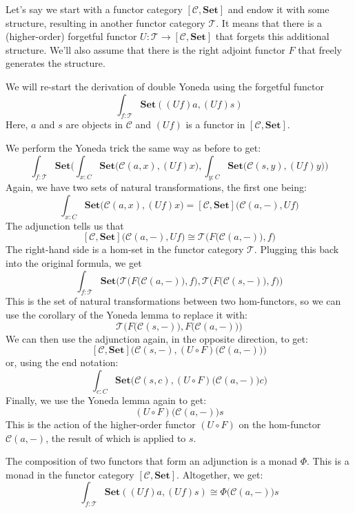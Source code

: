 \documentclass[11pt]{amsart}
\begin{document}
Let's say we start with a functor category $[\mathcal{C}, \mathbf{Set}]$ and endow it with some structure, resulting in another functor category $\mathcal{T}$. It means that there is a (higher-order) forgetful functor $U \colon \mathcal{T} \to [\mathcal{C}, \mathbf{Set}]$ that forgets this additional structure. We'll also assume that there is the right adjoint functor $F$ that freely generates the structure.

We will re-start the derivation of double Yoneda using the forgetful functor
\[ \int_{f \colon \mathcal{T}} \mathbf{Set}( (U f) a, (U f) s)\]
Here, $a$ and $s$ are objects in $\mathcal{C}$ and $(U f)$ is a functor in $[\mathcal{C}, \mathbf{Set}]$.

We perform the Yoneda trick the same way as before to get:
\[  \int_{f \colon \mathcal{T}}  \mathbf{Set}\Big(\int_{x \colon C} \mathbf{Set}\big(\mathcal{C}(a, x),(U f) x), \int_{y \colon C} \mathbf{Set}\big(\mathcal{C}(s, y),(U f) y\big)\Big)\]
Again, we have two sets of natural transformations, the first one being: 
\[\int_{x \colon C} \mathbf{Set}\big(\mathcal{C}(a, x), (U f) x\big) = [\mathcal{C}, \mathbf{Set}]\big(\mathcal{C}(a, -), U f\big)\]
The adjunction tells us that
\[ [\mathcal{C}, \mathbf{Set}]\big(\mathcal{C}(a, -), U f\big) \cong \mathcal{T}\Big(F\big(\mathcal{C}(a, -)\big), f\Big)\]
The right-hand side is a hom-set in the functor category $\mathcal{T}$. Plugging this back into the original formula, we get 
\[  \int_{f \colon \mathcal{T}}  \mathbf{Set}\Big(\mathcal{T}\Big(F\big(\mathcal{C}(a, -)\big), f\Big), \mathcal{T}\Big(F\big(\mathcal{C}(s, -)\big), f\Big) \Big)\]
This is the set of natural transformations between two hom-functors, so we can use the corollary of the Yoneda lemma to replace it with:
\[ \mathcal{T}\Big( F\big(\mathcal{C}(s, -)\big), F\big(\mathcal{C}(a, -)\big) \Big) \]
We can then use the adjunction again, in the opposite direction, to get:
\[  [\mathcal{C}, \mathbf{Set}] \Big( \mathcal{C}(s, -), (U \circ F)\big(\mathcal{C}(a, -)\big) \Big) \]
or, using the end notation:
\[ \int_{c \colon C} \mathbf{Set} \Big(\mathcal{C}(s, c), (U \circ F)\big(\mathcal{C}(a, -)\big) c \Big) \]
Finally, we use the Yoneda lemma again to get:
\[ (U \circ F) \big( \mathcal{C}(a, -) \big) s \]
This is the action of the higher-order functor $(U \circ F)$ on the hom-functor $\mathcal{C}(a, -)$, the result of which is applied to $s$.

The composition of two functors that form an adjunction is a monad $\Phi$. This is a monad in the functor category $[\mathcal{C}, \mathbf{Set}]$. Altogether, we get:
\[ \int_{f \colon \mathcal{T}} \mathbf{Set}( (U f) a, (U f) s) \cong \Phi \big( \mathcal{C}(a, -) \big) s \]
\end{document}
